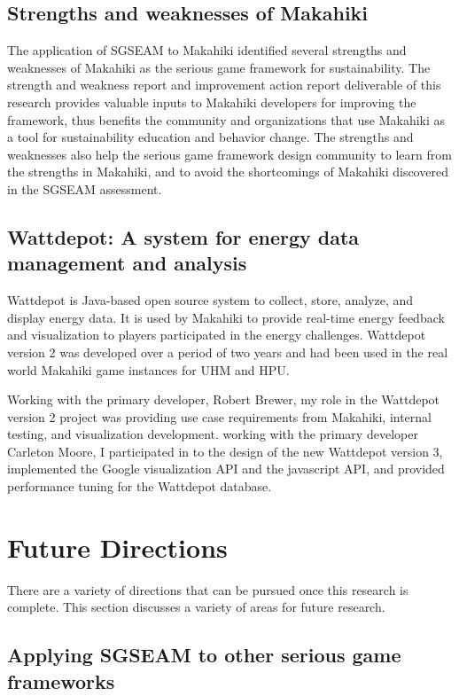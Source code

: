 \subsection{Strengths and weaknesses of Makahiki}

The application of SGSEAM to Makahiki identified several strengths and weaknesses of  Makahiki as the serious game framework for sustainability. The strength and weakness report and improvement action report deliverable of this research provides valuable inputs to Makahiki developers for improving the framework, thus benefits the community and organizations that use Makahiki as a tool for sustainability education and behavior change. The strengths and weaknesses also help the serious game framework design community to learn from the strengths in Makahiki, and to avoid the shortcomings of Makahiki discovered in the SGSEAM assessment. 

\subsection{Wattdepot: A system for energy data management and analysis}

Wattdepot \cite{csdl2-10-05} is Java-based open source system to collect, store, analyze, and display energy data. It is used by Makahiki to provide real-time energy feedback and visualization to players participated in the energy challenges. Wattdepot version 2 was developed over a period of two years and had been used in the real world Makahiki game instances for UHM and HPU.  

Working with the primary developer, Robert Brewer, my role in the Wattdepot version 2 project was providing use case requirements from Makahiki, internal testing, and visualization development. working with the primary developer Carleton Moore, I participated in to the design of the new Wattdepot version 3, implemented the Google visualization API and the javascript API, and provided performance tuning for the Wattdepot database.

\section{Future Directions}

There are a variety of directions that can be pursued once this research is complete. This section discusses a variety of areas for future research.

\subsection{Applying SGSEAM to other serious game frameworks}
\label{future:other-framework}


